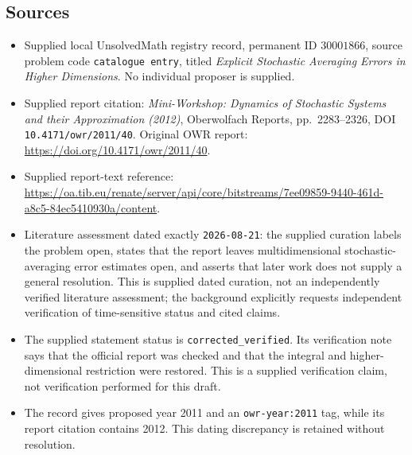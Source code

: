 \documentclass[11pt]{article}
\begin{document}
\subsection{Sources}
\begin{itemize}
\item Supplied local UnsolvedMath registry record, permanent ID \(30001866\), source problem code \texttt{catalogue entry}, titled \emph{Explicit Stochastic Averaging Errors in Higher Dimensions}. No individual proposer is supplied.
\item Supplied report citation: \emph{Mini-Workshop: Dynamics of Stochastic Systems and their Approximation (2012)}, Oberwolfach Reports, pp.\ 2283--2326, DOI \texttt{10.4171/owr/2011/40}. Original OWR report: \url{https://doi.org/10.4171/owr/2011/40}.
\item Supplied report-text reference: \url{https://oa.tib.eu/renate/server/api/core/bitstreams/7ee09859-9440-461d-a8c5-84ec5410930a/content}.
\item Literature assessment dated exactly \texttt{2026-08-21}: the supplied curation labels the problem open, states that the report leaves multidimensional stochastic-averaging error estimates open, and asserts that later work does not supply a general resolution. This is supplied dated curation, not an independently verified literature assessment; the background explicitly requests independent verification of time-sensitive status and cited claims.
\item The supplied statement status is \texttt{corrected\_verified}. Its verification note says that the official report was checked and that the integral and higher-dimensional restriction were restored. This is a supplied verification claim, not verification performed for this draft.
\item The record gives proposed year 2011 and an \texttt{owr-year:2011} tag, while its report citation contains 2012. This dating discrepancy is retained without resolution.
\end{itemize}
\end{document}
